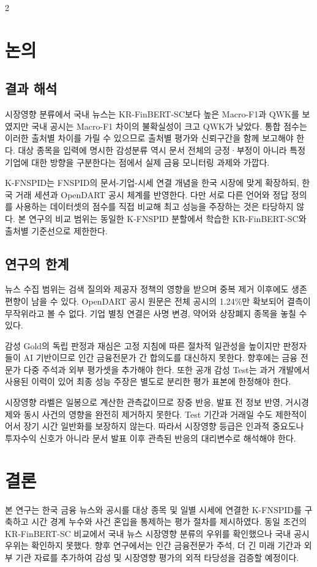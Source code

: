 \documentclass[10pt]{article}
\newcommand{\dataset}{K-FNSPID}
\begin{document}
\begin{multicols}{2}
\section{논의}

\subsection{결과 해석}

시장영향 분류에서 국내 뉴스는 KR-FinBERT-SC보다 높은 Macro-F1과 QWK를 보였지만 국내 공시는 Macro-F1 차이의 불확실성이 크고 QWK가 낮았다. 통합 점수는 이러한 출처별 차이를 가릴 수 있으므로 출처별 평가와 신뢰구간을 함께 보고해야 한다. 대상 종목을 입력에 명시한 감성분류 역시 문서 전체의 긍정·부정이 아니라 특정 기업에 대한 방향을 구분한다는 점에서 실제 금융 모니터링 과제와 가깝다.

\dataset{}는 FNSPID의 문서-기업-시세 연결 개념을 한국 시장에 맞게 확장하되, 한국 거래 세션과 OpenDART 공시 체계를 반영한다. 다만 서로 다른 언어와 정답 정의를 사용하는 데이터셋의 점수를 직접 비교해 최고 성능을 주장하는 것은 타당하지 않다. 본 연구의 비교 범위는 동일한 K-FNSPID 분할에서 학습한 KR-FinBERT-SC와 출처별 기준선으로 제한한다.

\subsection{연구의 한계}

뉴스 수집 범위는 검색 질의와 제공자 정책의 영향을 받으며 중복 제거 이후에도 생존 편향이 남을 수 있다. OpenDART 공시 원문은 전체 공시의 1.24\%만 확보되어 결측이 무작위라고 볼 수 없다. 기업 별칭 연결은 사명 변경, 약어와 상장폐지 종목을 놓칠 수 있다.

감성 Gold의 독립 판정과 재심은 고정 지침에 따른 절차적 일관성을 높이지만 판정자들이 AI 기반이므로 인간 금융전문가 간 합의도를 대신하지 못한다. 향후에는 금융 전문가 다중 주석과 외부 평가셋을 추가해야 한다. 또한 공개 감성 Test는 과거 개발에서 사용된 이력이 있어 최종 성능 주장은 별도로 분리한 평가 표본에 한정해야 한다.

시장영향 라벨은 일봉으로 계산한 관측값이므로 장중 반응, 발표 전 정보 반영, 거시경제와 동시 사건의 영향을 완전히 제거하지 못한다. Test 기간과 거래일 수도 제한적이어서 장기 시간 일반화를 보장하지 않는다. 따라서 시장영향 등급은 인과적 중요도나 투자수익 신호가 아니라 문서 발표 이후 관측된 반응의 대리변수로 해석해야 한다.

\section{결론}

본 연구는 한국 금융 뉴스와 공시를 대상 종목 및 일별 시세에 연결한 \dataset{}를 구축하고 시간 경계 누수와 사건 혼입을 통제하는 평가 절차를 제시하였다. 동일 조건의 KR-FinBERT-SC 비교에서 국내 뉴스 시장영향 분류의 우위를 확인했으나 국내 공시 우위는 확인하지 못했다. 향후 연구에서는 인간 금융전문가 주석, 더 긴 미래 기간과 외부 기관 자료를 추가하여 감성 및 시장영향 평가의 외적 타당성을 검증할 예정이다.

\begingroup
\small
\renewcommand{\emph}[1]{#1}


\endgroup

\end{multicols}
\end{document}
